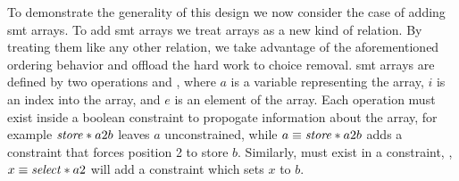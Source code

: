 To demonstrate the generality of this design we now consider the case of adding
\ac{smt} arrays. To add \ac{smt} arrays we treat arrays as a new kind of
relation. By treating them like any other relation, we take advantage of the
aforementioned ordering behavior and offload the hard work to choice removal.
\ac{smt} arrays are defined by two operations  and
, where $a$ is a variable representing the array, $i$ is an index
into the array, and $e$ is an element of the array. Each operation must exist
inside a boolean constraint to propogate information about the array, for
example $\mathit{store}*{a}{2}{b}$ leaves $a$ unconstrained, while $a \equiv
\mathit{store}*{a}{2}{b}$ adds a constraint that forces position 2 to store $b$.
Similarly, \select{} must exist in a constraint, \eg{}, $x \equiv
\mathit{select}*{a}{2}$ will add a constraint which sets $x$ to $b$.

